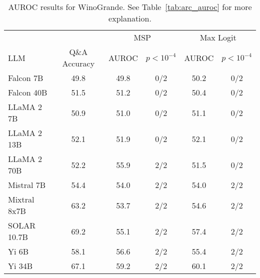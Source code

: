 \begin{table*}
\centering
\caption{AUROC results for WinoGrande. See Table~\ref{tab:arc_auroc} for more explanation.}
\label{tab:winogrande_auroc}
\begin{tabular}{lccccc}
\toprule
& & \multicolumn{2}{c}{MSP} & \multicolumn{2}{c}{Max Logit} \\ 
LLM & Q\&A Accuracy & AUROC & $p < 10^{-4}$ & AUROC & $p < 10^{-4}$\\ 
\cmidrule(lr){1-1} \cmidrule(lr){2-2} \cmidrule(lr){3-4} \cmidrule(lr){5-6}
Falcon 7B & 49.8 & 49.8 & 0/2 & 50.2 & 0/2 \\
Falcon 40B & 51.5 & 51.2 & 0/2 & 50.4 & 0/2 \\
LLaMA 2 7B & 50.9 & 51.0 & 0/2 & 51.1 & 0/2 \\
LLaMA 2 13B & 52.1 & 51.9 & 0/2 & 52.1 & 0/2 \\
LLaMA 2 70B & 52.2 & 55.9 & 2/2 & 51.5 & 0/2 \\
Mistral 7B & 54.4 & 54.0 & 2/2 & 54.0 & 2/2 \\
Mixtral 8x7B & 63.2 & 53.7 & 2/2 & 54.6 & 2/2 \\
SOLAR 10.7B & 69.2 & 55.1 & 2/2 & 57.4 & 2/2 \\
Yi 6B & 58.1 & 56.6 & 2/2 & 55.4 & 2/2 \\
Yi 34B & 67.1 & 59.2 & 2/2 & 60.1 & 2/2 \\
\bottomrule
\end{tabular}
\end{table*}
